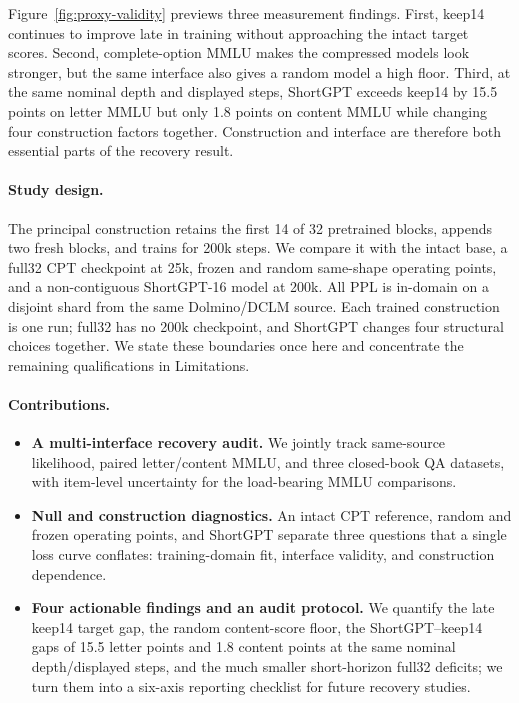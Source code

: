 Figure~\ref{fig:proxy-validity} previews three measurement findings. First,
keep14 continues to improve late in training without approaching the intact
target scores. Second, complete-option MMLU makes the compressed models look
stronger, but the same interface also gives a random model a high floor. Third,
at the same nominal depth and displayed steps, ShortGPT exceeds keep14 by
15.5 points on letter MMLU but only 1.8 points on content MMLU while changing
four construction factors together. Construction and interface are therefore
both essential parts of the recovery result.

\paragraph{Study design.}
The principal construction retains the first 14 of 32 pretrained blocks,
appends two fresh blocks, and trains for 200k steps. We compare it with the
intact base, a full32 CPT checkpoint at 25k, frozen and random same-shape
operating points, and a non-contiguous ShortGPT-16 model at 200k. All PPL is
in-domain on a disjoint shard from the same Dolmino/DCLM source. Each trained
construction is one run; full32 has no 200k checkpoint, and ShortGPT changes
four structural choices together. We state these boundaries once here and
concentrate the remaining qualifications in Limitations.

\paragraph{Contributions.}
\begin{itemize}[leftmargin=1.2em,itemsep=2pt]
\item \textbf{A multi-interface recovery audit.} We jointly track same-source
likelihood, paired letter/content MMLU, and three closed-book QA datasets, with
item-level uncertainty for the load-bearing MMLU comparisons.
\item \textbf{Null and construction diagnostics.} An intact CPT reference,
random and frozen operating points, and ShortGPT separate three questions that
a single loss curve conflates: training-domain fit, interface validity, and
construction dependence.
\item \textbf{Four actionable findings and an audit protocol.} We quantify the
late keep14 target gap, the random content-score floor, the
ShortGPT--keep14 gaps of 15.5 letter points and 1.8 content points at the same
nominal depth/displayed steps, and the much smaller short-horizon full32 deficits;
we turn them into a six-axis reporting checklist for future recovery studies.
\end{itemize}
